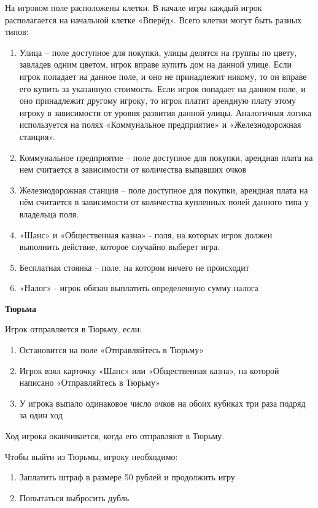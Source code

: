 На игровом поле расположены клетки. В начале игры каждый игрок располагается на начальной клетке «Вперёд». Всего клетки могут быть разных типов:
\begin{spacing}{0.9}
\begin{enumerate}
    \item Улица – поле доступное для покупки, улицы делятся на группы по цвету, завладев одним цветом, игрок вправе купить дом на данной улице. Если игрок попадает на данное поле, и оно не принадлежит никому, то он вправе его купить за указанную стоимость. Если игрок попадает на данном поле, и оно принадлежит другому игроку, то игрок платит арендную плату этому игроку в зависимости от уровня развития данной улицы. Аналогичная логика используется на полях «Коммунальное предприятие» и «Железнодорожная станция». 
    \item Коммунальное предприятие – поле доступное для покупки, арендная плата на нем считается в зависимости от количества выпавших очков
    \item Железнодорожная станция – поле доступное для покупки, арендная плата на нём считается в зависимости от количества купленных полей данного типа у владельца поля.
    \item «Шанс» и «Общественная казна» -  поля, на которых игрок должен выполнить действие, которое случайно выберет игра.
    \item Бесплатная стоянка – поле, на котором ничего не происходит
    \item «Налог» - игрок обязан выплатить определенную сумму налога
\end{enumerate}
\end{spacing}

\textbf{Тюрьма}

Игрок отправляется в Тюрьму, если:
\begin{spacing}{0.9}
\begin{enumerate}
    \item Остановится на поле «Отправляйтесь в Тюрьму» 
    \item Игрок взял карточку «Шанс» или «Общественная казна», на которой написано «Отправляйтесь в Тюрьму»
    \item У игрока выпало одинаковое число очков на обоих кубиках три раза подряд за один ход
\end{enumerate}
\end{spacing}

Ход игрока оканчивается, когда его отправляют в Тюрьму. 

Чтобы выйти из Тюрьмы, игроку необходимо:
\begin{spacing}{0.9}
\begin{enumerate}
    \item Заплатить штраф в размере 50 рублей и продолжить игру
    \item Попытаться выбросить дубль
\end{enumerate}
\end{spacing}

